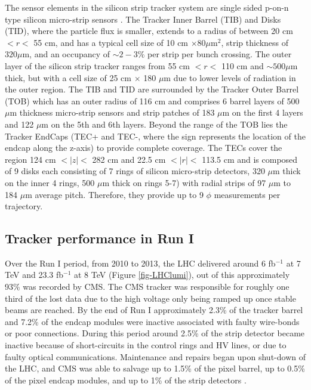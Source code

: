 The sensor elements in the silicon strip tracker system are single sided p-on-n type silicon micro-strip sensors \cite{SiliconStripSensors1,SiliconStripSensors2}. The Tracker Inner Barrel (TIB) and Disks (TID), where the particle flux is smaller, extends to a radius of between 20 cm $< r <$ 55 cm, and has a typical cell size of 10 cm $\times 80 \mu$m$^2$, strip thickness of $320 \mu$m, and an occupancy of $\sim2-3\%$ per strip per bunch crossing. The outer layer of the silicon strip tracker ranges from 55 cm $< r <$ 110 cm and $\sim500 \mu$m thick, but with a cell size of 25 cm $\times$ 180 $\mu$m due to lower levels of radiation in the outer region. The TIB and TID are surrounded by the Tracker Outer Barrel (TOB) which has an outer radius of 116 cm and comprises 6 barrel layers of 500 $\mu$m thickness micro-strip sensors and strip patches of 183 $\mu$m on the first 4 layers and 122 $\mu$m on the 5th and 6th layers. Beyond the range of the TOB lies the Tracker EndCaps (TEC+ and TEC-, where the sign represents the location of the endcap along the z-axis) to provide complete coverage. The TECs cover the region 124 cm $<|z|<$ 282 cm and 22.5 cm $<|r|<$ 113.5 cm and is composed of 9 disks each consisting of 7 rings of silicon micro-strip detectors, 320 $\mu$m thick on the inner 4 rings, 500 $\mu$m thick on rings 5-7) with radial strips of 97 $\mu$m to 184 $\mu$m average pitch. Therefore, they provide up to 9 $\phi$ measurements per trajectory.

\subsection{Tracker performance in Run I} \label{subsec-TrackerPerformance}

Over the Run I period, from 2010 to 2013, the LHC delivered around 6 fb$^{-1}$ at 7 TeV and 23.3 fb$^{-1}$ at 8 TeV (Figure \ref{fig-LHClumi}), out of this approximately 93\% was recorded by CMS. The CMS tracker was responsible for roughly one third of the lost data due to the high voltage only being ramped up once stable beams are reached. By the end of Run I approximately 2.3\% of the tracker barrel and 7.2\% of the endcap modules were inactive associated with faulty wire-bonds or poor connections. During this period around 2.5\% of the strip detector became inactive because of short-circuits in the control rings and HV lines, or due to faulty optical communications. Maintenance and repairs began upon shut-down of the LHC, and CMS was able to salvage up to 1.5\% of the pixel barrel, up to 0.5\% of the pixel endcap modules, and up to 1\% of the strip detectors \cite{TrackerPerformance}.

